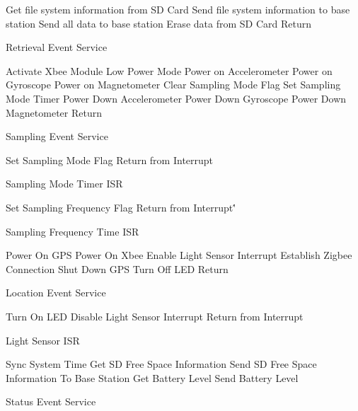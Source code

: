 \begin{algorithm}
\SetAlgoNoLine
Get file system information from SD Card\;
Send file system information to base station\;
Send all data to base station\;
Erase data from SD Card
Return\;
\caption{Retrieval Event Service}
\end{algorithm}

\begin{algorithm}
\SetAlgoNoLine
Activate Xbee Module Low Power Mode\;
Power on Accelerometer\;
Power on Gyroscope\;
Power on Magnetometer\;
Clear Sampling Mode Flag\;
Set Sampling Mode Timer\;
Power Down Accelerometer\;
Power Down Gyroscope\;
Power Down Magnetometer\;
Return\;
\caption{Sampling Event Service}
\end{algorithm}

\begin{algorithm}
\SetAlgoNoLine
Set Sampling Mode Flag\;
Return from Interrupt\;
\caption{Sampling Mode Timer ISR}
\end{algorithm}

\begin{algorithm}
\SetAlgoNoLine
Set Sampling Frequency Flag\;
Return from Interrupt\''
\caption{Sampling Frequency Time ISR}
\end{algorithm}

\begin{algorithm}
\SetAlgoNoLine
Power On GPS\;
Power On Xbee\;
Enable Light Sensor Interrupt\;
Establish Zigbee Connection\;
Shut Down GPS\;
Turn Off LED\;
Return\;
\caption{Location Event Service}
\end{algorithm}

\begin{algorithm}
\SetAlgoNoLine
Turn On LED\;
Disable Light Sensor Interrupt\;
Return from Interrupt\;
\caption{Light Sensor ISR}
\end{algorithm}

\begin{algorithm}
\SetAlgoNoLine
Sync System Time\;
Get SD Free Space Information\;
Send SD Free Space Information To Base Station\;
Get Battery Level\;
Send Battery Level\;
\caption{Status Event Service}
\end{algorithm}